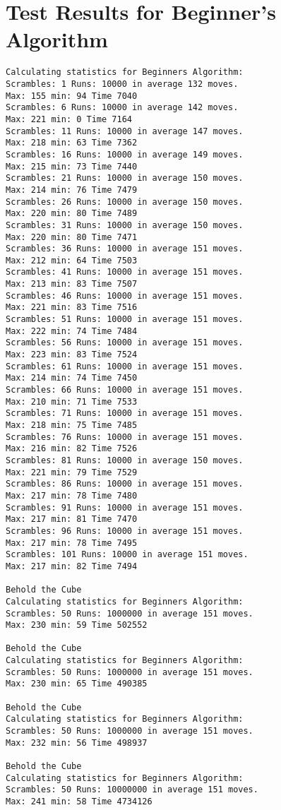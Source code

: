 \chapter{Test Results for Beginner's Algorithm}
\label{chap:kociembaResults}
\emptyTop{}
\begin{lstlisting}[breaklines=true, basicstyle=\ttfamily\footnotesize]
Calculating statistics for Beginners Algorithm:
Scrambles: 1 Runs: 10000 in average 132 moves. 
Max: 155 min: 94 Time 7040
Scrambles: 6 Runs: 10000 in average 142 moves. 
Max: 221 min: 0 Time 7164
Scrambles: 11 Runs: 10000 in average 147 moves. 
Max: 218 min: 63 Time 7362
Scrambles: 16 Runs: 10000 in average 149 moves. 
Max: 215 min: 73 Time 7440
Scrambles: 21 Runs: 10000 in average 150 moves. 
Max: 214 min: 76 Time 7479
Scrambles: 26 Runs: 10000 in average 150 moves. 
Max: 220 min: 80 Time 7489
Scrambles: 31 Runs: 10000 in average 150 moves. 
Max: 220 min: 80 Time 7471
Scrambles: 36 Runs: 10000 in average 151 moves. 
Max: 212 min: 64 Time 7503
Scrambles: 41 Runs: 10000 in average 151 moves. 
Max: 213 min: 83 Time 7507
Scrambles: 46 Runs: 10000 in average 151 moves. 
Max: 221 min: 83 Time 7516
Scrambles: 51 Runs: 10000 in average 151 moves. 
Max: 222 min: 74 Time 7484
Scrambles: 56 Runs: 10000 in average 151 moves. 
Max: 223 min: 83 Time 7524
Scrambles: 61 Runs: 10000 in average 151 moves. 
Max: 214 min: 74 Time 7450
Scrambles: 66 Runs: 10000 in average 151 moves. 
Max: 210 min: 71 Time 7533
Scrambles: 71 Runs: 10000 in average 151 moves. 
Max: 218 min: 75 Time 7485
Scrambles: 76 Runs: 10000 in average 151 moves. 
Max: 216 min: 82 Time 7526
Scrambles: 81 Runs: 10000 in average 150 moves. 
Max: 221 min: 79 Time 7529
Scrambles: 86 Runs: 10000 in average 151 moves. 
Max: 217 min: 78 Time 7480
Scrambles: 91 Runs: 10000 in average 151 moves. 
Max: 217 min: 81 Time 7470
Scrambles: 96 Runs: 10000 in average 151 moves. 
Max: 217 min: 78 Time 7495
Scrambles: 101 Runs: 10000 in average 151 moves. 
Max: 217 min: 82 Time 7494

Behold the Cube
Calculating statistics for Beginners Algorithm:
Scrambles: 50 Runs: 1000000 in average 151 moves. 
Max: 230 min: 59 Time 502552

Behold the Cube
Calculating statistics for Beginners Algorithm:
Scrambles: 50 Runs: 1000000 in average 151 moves. 
Max: 230 min: 65 Time 490385

Behold the Cube
Calculating statistics for Beginners Algorithm:
Scrambles: 50 Runs: 1000000 in average 151 moves. 
Max: 232 min: 56 Time 498937

Behold the Cube
Calculating statistics for Beginners Algorithm:
Scrambles: 50 Runs: 10000000 in average 151 moves. 
Max: 241 min: 58 Time 4734126

\end{lstlisting}